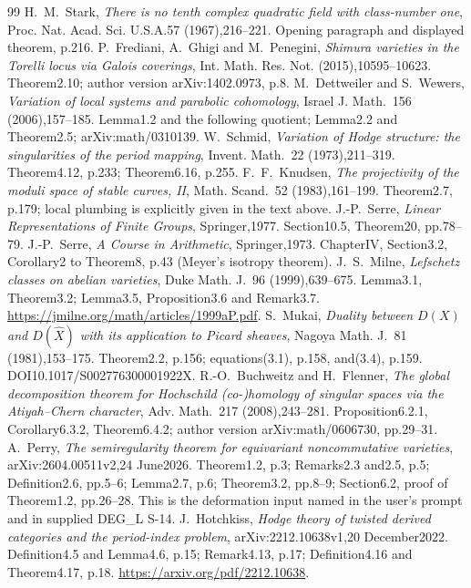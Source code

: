 \begin{thebibliography}{99}
 H.~M.~Stark, \emph{There is no tenth complex quadratic field with class-number one}, Proc. Nat. Acad. Sci. U.S.A.57 (1967),216--221. Opening paragraph and displayed theorem, p.216.
 P.~Frediani, A.~Ghigi and M.~Penegini, \emph{Shimura varieties in the Torelli locus via Galois coverings}, Int. Math. Res. Not. (2015),10595--10623. Theorem2.10; author version arXiv:1402.0973, p.8.
 M.~Dettweiler and S.~Wewers, \emph{Variation of local systems and parabolic cohomology}, Israel J. Math.~156 (2006),157--185. Lemma1.2 and the following quotient; Lemma2.2 and Theorem2.5; arXiv:math/0310139.
 W.~Schmid, \emph{Variation of Hodge structure: the singularities of the period mapping}, Invent. Math.~22 (1973),211--319. Theorem4.12, p.233; Theorem6.16, p.255.
 F.~F.~Knudsen, \emph{The projectivity of the moduli space of stable curves, II}, Math. Scand.~52 (1983),161--199. Theorem2.7, p.179; local plumbing is explicitly given in the text above.
 J.-P.~Serre, \emph{Linear Representations of Finite Groups}, Springer,1977. Section10.5, Theorem20, pp.78--79.
 J.-P.~Serre, \emph{A Course in Arithmetic}, Springer,1973. ChapterIV, Section3.2, Corollary2 to Theorem8, p.43 (Meyer's isotropy theorem).
 J.~S.~Milne, \emph{Lefschetz classes on abelian varieties}, Duke Math. J.~96 (1999),639--675. Lemma3.1, Theorem3.2; Lemma3.5, Proposition3.6 and Remark3.7. \url{https://jmilne.org/math/articles/1999aP.pdf}.
 S.~Mukai, \emph{Duality between $D(X)$ and $D(\widehat X)$ with its application to Picard sheaves}, Nagoya Math. J.~81 (1981),153--175. Theorem2.2, p.156; equations(3.1), p.158, and(3.4), p.159. DOI10.1017/S002776300001922X.
 R.-O.~Buchweitz and H.~Flenner, \emph{The global decomposition theorem for Hochschild (co-)homology of singular spaces via the Atiyah--Chern character}, Adv. Math.~217 (2008),243--281. Proposition6.2.1, Corollary6.3.2, Theorem6.4.2; author version arXiv:math/0606730, pp.29--31.
 A.~Perry, \emph{The semiregularity theorem for equivariant noncommutative varieties}, arXiv:2604.00511v2,24 June2026. Theorem1.2, p.3; Remarks2.3 and2.5, p.5; Definition2.6, pp.5--6; Lemma2.7, p.6; Theorem3.2, pp.8--9; Section6.2, proof of Theorem1.2, pp.26--28. This is the deformation input named in the user's prompt and in supplied DEG\_L S-14.
 J.~Hotchkiss, \emph{Hodge theory of twisted derived categories and the period-index problem}, arXiv:2212.10638v1,20 December2022. Definition4.5 and Lemma4.6, p.15; Remark4.13, p.17; Definition4.16 and Theorem4.17, p.18. \url{https://arxiv.org/pdf/2212.10638}.

\end{thebibliography}
